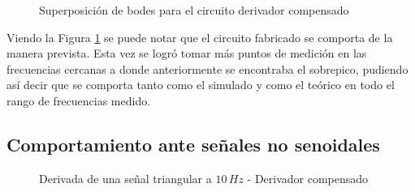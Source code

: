 \documentclass[11pt, a4paper]{article}
\begin{document}
\begin{figure}[H]
	\begin{center}
		\caption{Superposición de bodes para el circuito derivador compensado}
		\label{fig:superposicion3casosderivadorCOMPENSADO}
	\end{center}
\end{figure}

Viendo la Figura \ref{fig:superposicion3casosderivadorCOMPENSADO} se puede notar que el circuito fabricado se comporta de la manera prevista. Esta vez se logró tomar más puntos de medición en las frecuencias cercanas a donde anteriormente se encontraba el sobrepico, pudiendo así decir que se comporta tanto como el simulado y como el teórico en todo el rango de frecuencias medido.

\subsection{Comportamiento ante señales no senoidales}

\begin{figure}[H]
	\begin{center}
		\caption{Derivada de una señal triangular a $10 \,Hz$ - Derivador compensado}
		\label{fig:derivtriangCOMP10Hz}
	\end{center}
\end{figure}
\end{document}
